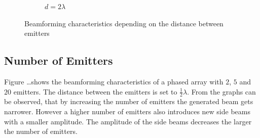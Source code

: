 \begin{figure}[ht]
\begin{subfigure}[b]{0.32\textwidth}
    \caption{$d = 2\lambda$}
    \label{fig:theory:beam:d2}
  \end{subfigure}
  \caption{Beamforming characteristics depending on the distance between emitters}
  \label{fig:theory:beam:d}
\end{figure}
%
\subsection{Number of Emitters}

Figure \dots shows the beamforming characteristics of a phased array with $2$, $5$ and $20$ emitters. The distance between the emitters is set to $\frac{1}{2} \lambda$. From the graphs can be observed, that by increasing the number of emitters the generated beam gets narrower. However a higher number of emitters also introduces new side beams with a smaller amplitude. The amplitude of the side beams decreases the larger the number of emitters.
%
